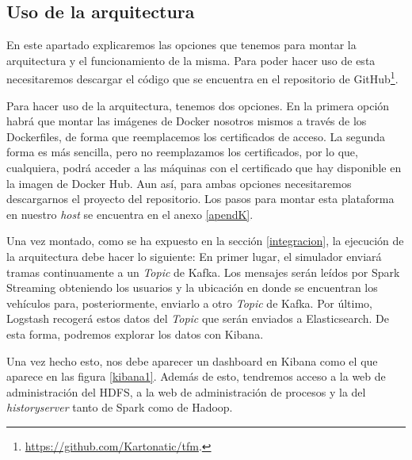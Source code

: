 \subsection{Uso de la arquitectura\label{uso}}


En este apartado explicaremos las opciones que tenemos para 
montar la arquitectura y el funcionamiento de la
misma. Para poder hacer uso de esta necesitaremos descargar
el código que se encuentra en el repositorio de
GitHub\footnote{\url{https://github.com/Kartonatic/tfm}.}.

Para hacer uso de la arquitectura, tenemos dos opciones. En la primera
opción habrá que montar las imágenes de Docker nosotros mismos a través de
los Dockerfiles, de forma que reemplacemos los certificados de acceso. La
segunda forma es más sencilla, pero no reemplazamos los certificados, por
lo que, cualquiera, podrá acceder a las máquinas con el certificado que hay
disponible en la imagen de Docker Hub. Aun así, para ambas opciones
necesitaremos descargarnos el proyecto del repositorio. Los pasos
para montar esta plataforma en nuestro \emph{host} se encuentra
en el anexo \ref{apendK}.

Una vez montado, como se ha expuesto en la sección \ref{integracion},
la ejecución de la arquitectura debe hacer lo siguiente: En primer lugar, 
el simulador enviará tramas continuamente a un \emph{Topic} de Kafka.
Los mensajes serán leídos por Spark Streaming obteniendo los usuarios 
y la ubicación en donde se encuentran los vehículos para, posteriormente,
enviarlo a otro \emph{Topic} de Kafka. Por último, Logstash recogerá estos
datos del \emph{Topic} que serán enviados a Elasticsearch. De esta forma,
podremos explorar los datos con Kibana.

Una vez hecho esto, nos debe aparecer un dashboard en Kibana como el que
aparece en las figura \ref{kibana1}. Además de esto, tendremos acceso a la
web de administración del HDFS, a la web de administración de procesos y
la del \emph{historyserver} tanto de Spark como de Hadoop.

